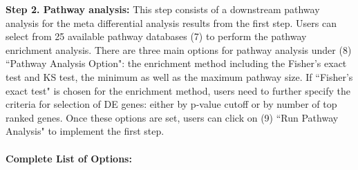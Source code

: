 \textbf{Step 2. Pathway analysis:} This step consists of a downstream pathway analysis for the meta differential analysis results from the first step. Users can select from 25 available pathway databases (7) to perform the pathway enrichment analysis. There are three main options for pathway analysis under (8) ``Pathway Analysis Option": the enrichment method including the Fisher's exact test and KS test, the minimum as well as the maximum pathway size. If ``Fisher's exact test" is chosen for the enrichment method, users need to further specify the criteria for selection of DE genes: either by p-value cutoff or by number of top ranked genes. Once these options are set, users can click on (9) ``Run Pathway Analysis" to implement the first step. \\~\\


\textbf{Complete List of Options:} 

